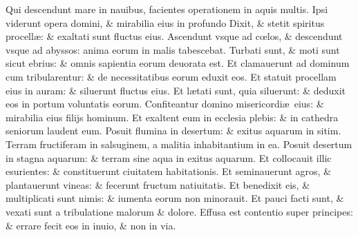\documentclass[a5paper,10pt]{book}
\def\ae{æ}
\def\oe{œ}
\begin{document}
\begin{multicols*}{2}
\newline \color{red} Q\color{black}ui descendunt mare in nauibus, facientes operationem in aquis multis.
\newline \color{red} I\color{black}psi viderunt opera domini, \& mirabilia eius in profundo
\newline \color{red} D\color{black}ixit, \& stetit spiritus procell\ae : \& exaltati sunt fluctus eius.
\newline \color{red} A\color{black}scendunt vsque ad c\oe los, \& descendunt vsque ad abyssos: anima eorum in malis tabescebat.
\newline \color{red} T\color{black}urbati sunt, \& moti sunt sicut ebrius: \& omnis sapientia eorum deuorata est.
\newline \color{red} E\color{black}t clamauerunt ad dominum cum tribularentur: \& de necessitatibus eorum eduxit eos.
\newline \color{red} E\color{black}t statuit procellam eius in auram: \& siluerunt fluctus eius.
\newline \color{red} E\color{black}t l\ae tati sunt, quia siluerunt: \& deduxit eos in portum voluntatis eorum.
\newline \color{red} C\color{black}onfiteantur domino misericordi\ae \ eius: \& mirabilia eius filijs hominum.
\newline \color{red} E\color{black}t exaltent eum in ecclesia plebis: \& in cathedra seniorum laudent eum.
\newline \color{red} P\color{black}osuit flumina in desertum: \& exitus aquarum in sitim.
\newline \color{red} T\color{black}erram fructiferam in salsuginem, a malitia inhabitantium in ea.
\newline \color{red} P\color{black}osuit desertum in stagna aquarum: \& terram sine aqua in exitus aquarum.
\newline \color{red} E\color{black}t collocauit illic esurientes: \& constituerunt ciuitatem habitationis.
\newline \color{red} E\color{black}t seminauerunt agros, \& plantauerunt vineas: \& fecerunt fructum natiuitatis.
\newline \color{red} E\color{black}t benedixit eis, \& multiplicati sunt nimis: \& iumenta eorum non minorauit.
\newline \color{red} E\color{black}t pauci facti sunt, \& vexati sunt a tribulatione malorum \& dolore.
\newline \color{red} E\color{black}ffusa est contentio super principes: \& errare fecit eos in inuio, \& non in via.%

\end{multicols*}
\end{document}
